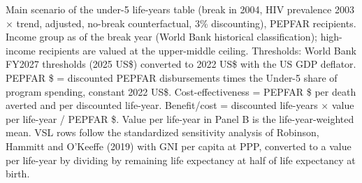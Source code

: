 \begin{table}[htbp]
\begin{minipage}{\textwidth}\footnotesize Main scenario of the under-5 life-years table (break in 2004, HIV prevalence 2003 $\times$ trend, adjusted, no-break counterfactual, 3\% discounting), PEPFAR recipients. Income group as of the break year (World Bank historical classification); high-income recipients are valued at the upper-middle ceiling. Thresholds: World Bank FY2027 thresholds (2025 US\$) converted to 2022 US\$ with the US GDP deflator. PEPFAR \$ = discounted PEPFAR disbursements times the Under-5 share of program spending, constant 2022 US\$. Cost-effectiveness = PEPFAR \$ per death averted and per discounted life-year. Benefit/cost = discounted life-years $\times$ value per life-year / PEPFAR \$. Value per life-year in Panel B is the life-year-weighted mean. VSL rows follow the standardized sensitivity analysis of Robinson, Hammitt and O'Keeffe (2019) with GNI per capita at PPP, converted to a value per life-year by dividing by remaining life expectancy at half of life expectancy at birth.\end{minipage}
\end{table}
